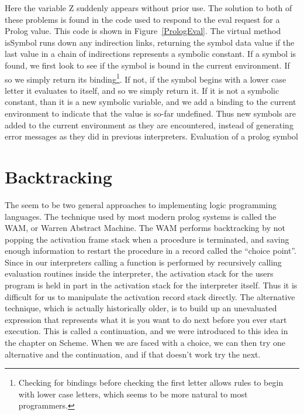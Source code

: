Here the variable Z suddenly appears without prior use.  The solution to both of
these problems is found in the code used to respond to the {\sf eval} request
for a Prolog value.  This code is shown in Figure~\ref{PrologEval}.  The virtual
method {\sf isSymbol} runs down any indirection links, returning the symbol data
value if the last value in a chain of indirections represents a symbolic
constant.  If a symbol is found, we first look to see if the symbol is bound in
the current environment.  If so we simply return its binding\footnote{Checking
    for bindings before checking the first letter allows rules to begin with
    lower case letters, which seems to be more natural to most programmers.}.
If not, if the symbol begins with a lower case letter it evaluates to itself,
and so we simply return it.  If it is not a symbolic constant, than it is a new
symbolic variable, and we add a binding to the current environment to indicate
that the value is so-far undefined.  Thus new symbols are added to the current
environment as they are encountered, instead of generating error messages as
they did in previous interpreters.
%
{Evaluation of a prolog symbol}

\section{Backtracking}

The seem to be two general approaches to implementing logic programming
languages.  The technique used by most modern prolog systems is called the WAM,
or Warren Abstract Machine.  The WAM performs backtracking by not popping the
activation frame stack when a procedure is terminated, and saving enough
information to restart the procedure in a record called the ``choice point''.
Since in our interpreters calling a function is performed by recursively calling
evaluation routines inside the interpreter, the activation stack for the users
program is held in part in the activation stack for the interpreter itself.
Thus it is difficult for us to manipulate the activation record stack directly.
The alternative technique, which is actually historically older, is to build up
an unevaluated expression that represents what it is you want to do next before
you ever start execution.  This is called a continuation, and we were introduced
to this idea in the chapter on Scheme.  When we are faced with a choice, we can
then try one alternative and the continuation, and if that doesn't work try the
next.

